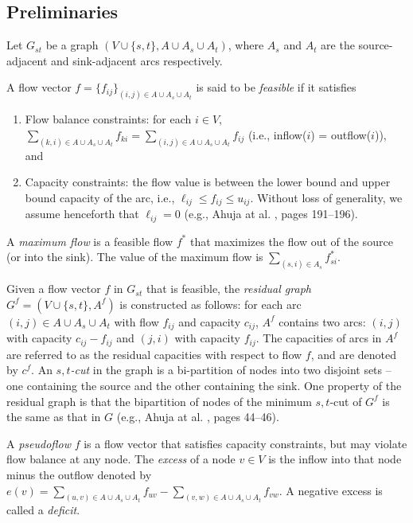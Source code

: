 \documentclass{article}
\begin{document}
\subsection{Preliminaries}
\label{section:prelims}

Let $G_{st}$ be a graph $(V\cup\{s,t\}, A\cup A_s \cup A_t)$, where $A_s$ and $A_t$ are the source-adjacent and sink-adjacent arcs respectively.

A flow vector $f = \{f_{ij}\}_{(i,j) \in A\cup A_s \cup A_t}$ is said to be {\em feasible} if it satisfies
\begin{enumerate}
\item Flow balance constraints: for each $i \in V$, $\sum_{(k,i)\in A\cup A_s \cup A_t} f_{ki} = \sum_{(i,j)\in A\cup A_s \cup A_t} f_{ij}$ (i.e., inflow($i$) = outflow($i$)), and
\item Capacity constraints: the flow value is between the lower bound and upper bound capacity of the arc, i.e.,  $\ell_{ij} \leq f_{ij} \leq u_{ij}$.  Without loss of generality, we assume henceforth that $\ell_{ij} = 0$ (e.g., Ahuja at al. \cite{AhuMO93}, pages 191--196).
\end{enumerate}

A {\em maximum flow} is a feasible flow $f^*$ that maximizes the flow out of the source (or into the sink).  The value of the maximum flow is $\sum_{(s,i) \in A_s} f^*_{si}$.

Given a flow vector $f$ in $G_{st}$ that is feasible, the {\em residual graph} $G^f=(V \cup \{s,t\}, A^f)$ is constructed as follows: for each arc $(i,j) \in A \cup A_s \cup A_t$ with flow $f_{ij}$ and capacity $c_{ij}$, $A^f$ contains two arcs: $(i,j)$ with capacity $c_{ij} - f_{ij}$ and $(j,i)$ with capacity $f_{ij}$.  The capacities of arcs in $A^f$ are referred to as the residual capacities with respect to flow $f$, and are denoted by $c^f$.  An {\em $s,t$-cut} in the graph is a bi-partition of nodes into two disjoint sets -- one containing the source and the other containing the sink.  One property of the residual graph is that the bipartition of nodes of the minimum $s,t$-cut of $G^f$ is the same as that in $G$ (e.g., Ahuja at al. \cite{AhuMO93}, pages 44--46).

A {\em pseudoflow} $f$ is a flow vector that satisfies capacity constraints, but may violate flow balance at any node. The {\em excess} of a node $v\in V$ is the inflow into that node minus the outflow denoted by $e(v) = \sum_{(u,v)\in A\cup A_s\cup A_t} f_{uv} - \sum_{(v,w)\in A\cup A_s\cup A_t} f_{vw}$. A negative excess is called a {\em deficit}.
\end{document}
